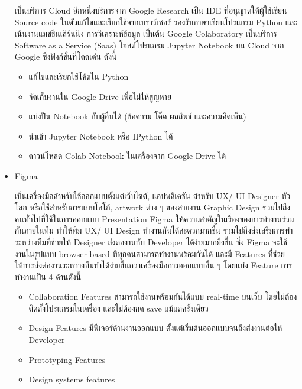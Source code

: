 \documentclass[12pt,oneside,openright,a4paper]{cpe-thai-project}
\begin{document}
\begin{itemize}
      \hspace{1cm}เป็นบริการ Cloud อีกหนึ่งบริการจาก Google Research เป็น IDE ที่อนุญาตให้ผู้ใช้เขียน Source code ในตัวแก้ไขและเรียกใช้จากเบราว์เซอร์ 
      รองรับภาษาเขียนโปรแกรม Python และเน้นงานแมชชีนเลิร์นนิง การวิเคราะห์ข้อมูล เป็นต้น 
      Google Colaboratory เป็นบริการ Software as a Service (Saas) โฮสต์โปรแกรม Jupyter Notebook บน Cloud จาก Google ซึ่งฟังก์ชั่นที่โดดเด่น ดังนี้ \cite{colab}
        \begin{itemize}
          \item แก้ไขและเรียกใช้โค้ดใน Python
          \item จัดเก็บงานใน Google Drive เพื่อไม่ให้สูญหาย
          \item แบ่งปัน Notebook กับผู้อื่นได้ (ข้อความ โค๊ด ผลลัพธ์ และความคิดเห็น)
          \item นำเข้า Jupyter Notebook หรือ IPython ได้
          \item ดาวน์โหลด Colab Notebook ในเครื่องจาก Google Drive ได้
        \end{itemize}
      \item Figma
      
      \hspace{1cm}เป็นเครื่องมือสำหรับใช้ออกแบบตั้งแต่เว็บไซต์, แอปพลิเคชัน สำหรับ UX/ UI Designer ทั่วโลก 
      หรือใช้สำหรับการแบบโลโก้, artwork ต่าง ๆ ของสายงาน Graphic Design รวมไปถึงคนทั่วไปที่ใช้ในการออกแบบ Presentation 
      Figma ให้ความสำคัญในเรื่องของการทำงานร่วมกันภายในทีม ทำให้ทีม UX/ UI Design ทำงานกันได้สะดวกมากขึ้น 
      รวมไปถึงส่งเสริมการทำระหว่างทีมที่ช่วยให้ Designer ส่งต่องานกับ Developer ได้ง่ายมากยิ่งขึ้น 
      ซึ่ง Figma จะใช้งานในรูปแบบ browser-based ที่ทุกคนสามารถทำงานพร้อมกันได้ 
      และมี Features ที่ช่วยให้การส่งต่องานระหว่างทีมทำได้ง่ายขึ้นกว่าเครื่องมือการออกแบบอื่น ๆ 
      โดยแบ่ง Feature การทำงานเป็น 4 ด้านดังนี้ \cite{figma}
        \begin{itemize}
          \item Collaboration Features
          \newline สามารถใช้งานพร้อมกันได้แบบ real-time บนเว็บ โดยไม่ต้องติดตั้งโปรแกรมในเครื่อง และไม่ต้องกด save แม้แต่ครั้งเดียว
          \item Design Features
          \newline มีฟีเจอร์ด้านงานออกแบบ ตั้งแต่เริ่มต้นออกแบบจนถึงส่งงานต่อให้ Developer
          \item Prototyping Features
          \item Design systems features
        \end{itemize}
    \end{itemize}
\end{document}
